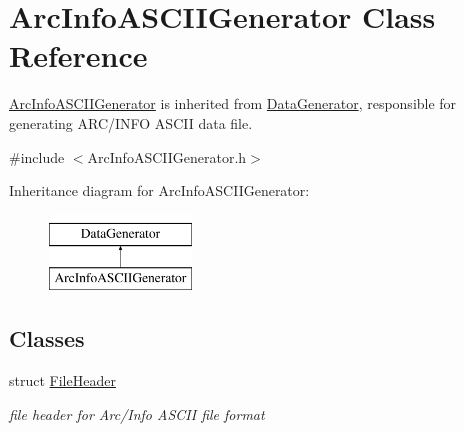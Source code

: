 \hypertarget{classArcInfoASCIIGenerator}{\section{\-Arc\-Info\-A\-S\-C\-I\-I\-Generator \-Class \-Reference}
\label{classArcInfoASCIIGenerator}
}


\hyperlink{classArcInfoASCIIGenerator}{\-Arc\-Info\-A\-S\-C\-I\-I\-Generator} is inherited from \hyperlink{classDataGenerator}{\-Data\-Generator}, responsible for generating \-A\-R\-C/\-I\-N\-F\-O \-A\-S\-C\-I\-I data file.  




{\ttfamily \#include $<$\-Arc\-Info\-A\-S\-C\-I\-I\-Generator.\-h$>$}

\-Inheritance diagram for \-Arc\-Info\-A\-S\-C\-I\-I\-Generator\-:\begin{figure}[H]
\begin{center}
\leavevmode
\includegraphics[height=2.000000cm]{classArcInfoASCIIGenerator}
\end{center}
\end{figure}
\subsection*{\-Classes}
\begin{DoxyCompactItemize}
\item 
struct \hyperlink{structArcInfoASCIIGenerator_1_1FileHeader}{\-File\-Header}
\begin{DoxyCompactList}\small\item\em file header for \-Arc/\-Info \-A\-S\-C\-I\-I file format \end{DoxyCompactList}\end{DoxyCompactItemize}
